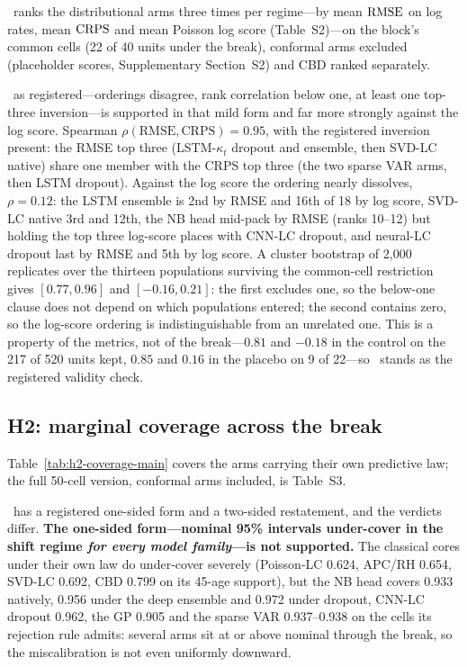 \Hone\ ranks the distributional arms three times per regime---by mean $\operatorname{RMSE}$ on
log rates, mean $\operatorname{CRPS}$ and mean Poisson log score (Table~S2)---on the block's
common cells (22 of 40 units under the break), conformal arms excluded
(placeholder scores, Supplementary Section~S2) and CBD ranked separately.

\Hone\ as registered---orderings disagree, rank correlation below one, at least
one top-three inversion---is supported in that mild form and far more strongly
against the log score. Spearman $\rho(\text{RMSE},\text{CRPS}) = 0.95$, with the
registered inversion present: the RMSE top three (LSTM-$\kappa_t$ dropout and
ensemble, then SVD-LC native) share one member with the CRPS top three (the two
sparse VAR arms, then LSTM dropout). Against the log score the ordering nearly
dissolves, $\rho=0.12$: the LSTM ensemble is 2nd by RMSE and 16th of 18 by log
score, SVD-LC native 3rd and 12th, the NB head mid-pack by RMSE (ranks 10--12)
but holding the top three log-score places with CNN-LC dropout, and neural-LC
dropout last by RMSE and 5th by log score. A cluster bootstrap of 2{,}000
replicates over the thirteen populations surviving the common-cell restriction
gives $[0.77, 0.96]$ and $[-0.16, 0.21]$: the first excludes one, so the
below-one clause does not depend on which populations entered; the second
contains zero, so the log-score ordering is indistinguishable from an unrelated
one. This is a property of the metrics, not of the break---$0.81$ and $-0.18$ in
the control on the 217 of 520 units kept, $0.85$ and $0.16$ in the placebo on 9
of 22---so \Hone\ stands as the registered validity check.

\subsection{H2: marginal coverage across the break}


Table~\ref{tab:h2-coverage-main} covers the arms carrying their own predictive
law; the full 50-cell version, conformal arms included, is Table~S3.

\Htwo\ has a registered one-sided form and a two-sided restatement, and the
verdicts differ. \textbf{The one-sided form---nominal 95\% intervals under-cover
in the shift regime \emph{for every model family}---is not supported.} The
classical cores under their own law do under-cover severely (Poisson-LC 0.624,
APC/RH 0.654, SVD-LC 0.692, CBD 0.799 on its 45-age support), but the NB head
covers 0.933 natively, 0.956 under the deep ensemble and 0.972 under dropout,
CNN-LC dropout 0.962, the GP 0.905 and the sparse VAR 0.937--0.938 on the cells
its rejection rule admits: several arms sit at or above nominal through the
break, so the miscalibration is not even uniformly downward.

